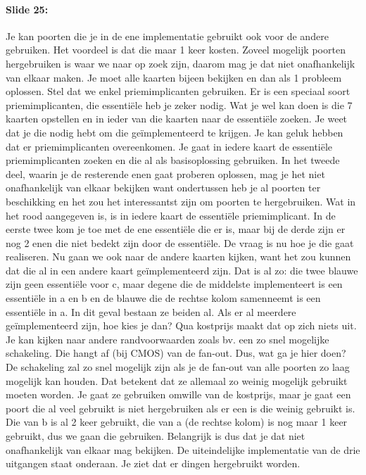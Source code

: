 \documentclass[10pt,a4paper]{book}
\begin{document}
\paragraph{Slide 25:} Je kan poorten die je in de ene implementatie gebruikt ook voor de andere gebruiken. Het voordeel is dat die maar 1 keer kosten. Zoveel mogelijk poorten hergebruiken is waar we naar op zoek zijn, daarom mag je dat niet onafhankelijk van elkaar maken. Je moet alle kaarten bijeen bekijken en dan als 1 probleem oplossen. Stel dat we enkel priemimplicanten gebruiken. Er is een speciaal soort priemimplicanten, die essenti\"ele heb je zeker nodig. Wat je wel kan doen is die 7 kaarten opstellen en in ieder van die kaarten naar de essenti\"ele zoeken. Je weet dat je die nodig hebt om die ge\"implementeerd te krijgen. Je kan geluk hebben dat er priemimplicanten overeenkomen. Je gaat in iedere kaart de essenti\"ele priemimplicanten zoeken en die al als basisoplossing gebruiken. In het tweede deel, waarin je de resterende enen gaat proberen oplossen, mag je het niet onafhankelijk van elkaar bekijken want ondertussen heb je al poorten ter beschikking en het zou het interessantst zijn om poorten te hergebruiken. Wat in het rood aangegeven is, is in iedere kaart de essenti\"ele priemimplicant. In de eerste twee kom je toe met de ene essenti\"ele die er is, maar bij de derde zijn er nog 2 enen die niet bedekt zijn door de essenti\"ele. De vraag is nu hoe je die gaat realiseren. Nu gaan we ook naar de andere kaarten kijken, want het zou kunnen dat die al in een andere kaart ge\"implementeerd zijn. Dat is al zo: die twee blauwe zijn geen essenti\"ele voor c, maar degene die de middelste implementeert is een essenti\"ele in a en b en de blauwe die de rechtse kolom samenneemt is een essenti\"ele in a. In dit geval bestaan ze beiden al. Als er al meerdere ge\"implementeerd zijn, hoe kies je dan? Qua kostprijs maakt dat op zich niets uit. Je kan kijken naar andere randvoorwaarden zoals bv. een zo snel mogelijke schakeling. Die hangt af (bij CMOS) van de fan-out. Dus, wat ga je hier doen? De schakeling zal zo snel mogelijk zijn als je de fan-out van alle poorten zo laag mogelijk kan houden. Dat betekent dat ze allemaal zo weinig mogelijk gebruikt moeten worden. Je gaat ze gebruiken omwille van de kostprijs, maar je gaat een poort die al veel gebruikt is niet hergebruiken als er een is die weinig gebruikt is. Die van b is al 2 keer gebruikt, die van a (de rechtse kolom) is nog maar 1 keer gebruikt, dus we gaan die gebruiken. Belangrijk is dus dat je dat niet onafhankelijk van elkaar mag bekijken. De uiteindelijke implementatie van de drie uitgangen staat onderaan. Je ziet dat er dingen hergebruikt worden. 
\end{document}
